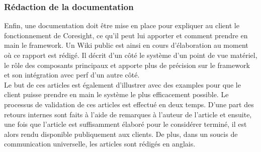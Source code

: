 \subsubsection{Rédaction de la documentation}
\label{sec:wiki}

Enfin, une documentation doit être mise en place pour expliquer au client le
fonctionnement de Coresight, ce qu'il peut lui apporter et comment prendre en
main le framework. Un Wiki public est ainsi en cours d'élaboration au moment
où ce rapport est rédigé. Il décrit d'un côté le système d'un point de vue
matériel, le rôle des composants principaux et apporte plus de précision sur
le framework et son intégration avec perf d'un autre côté. \\

Le but de ces articles est également d'illustrer avec des examples pour que le
client puisse prendre en main le système le plus efficacement possible. Le
processus de validation de ces articles est effectué en deux temps. D'une part
des retours internes sont faits à l'aide de remarques à l'auteur de l'article
et ensuite, une fois que l'article est suffisamment élaboré pour le considérer
terminé, il est alors rendu disponible publiquement aux clients. De plus, dans
un soucis de communication universelle, les articles sont rédigés en anglais.

